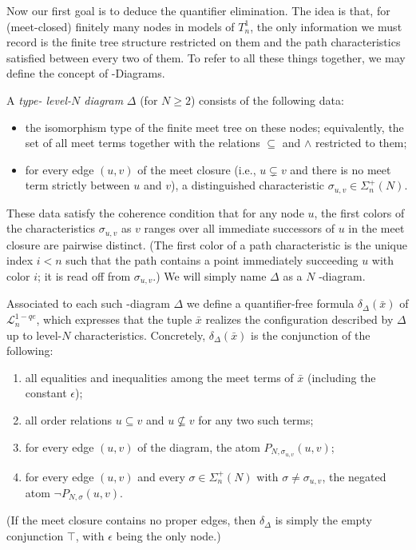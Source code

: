 \documentclass{amsart}
\theoremstyle{definition}
\begin{document}
Now our first goal is to deduce the quantifier elimination. The idea is that, for (meet-closed) finitely many nodes in models of $T_n^1$, the only information we must record is the finite tree structure restricted on them and the path characteristics satisfied between every two of them. To refer to all these things together, we may define the concept of \MakeUppercase{}-Diagrams.

A \emph{type-\MakeUppercase{} level-$N$ diagram} $\Delta$ (for $N\ge 2$) consists of the following data:
\begin{itemize}
    \item the isomorphism type of the finite meet tree on these nodes; equivalently, the set of all meet terms together with the relations $\subseteq$ and $\wedge$ restricted to them;
    \item for every edge $(u,v)$ of the meet closure (i.e., $u\subsetneq v$ and there is no meet term strictly between $u$ and $v$), a distinguished characteristic $\sigma_{u,v}\in\Sigma_n^{+}(N)$.
\end{itemize}
These data satisfy the coherence condition that for any node $u$, the first colors of the characteristics $\sigma_{u,v}$ as $v$ ranges over all immediate successors of $u$ in the meet closure are pairwise distinct. (The first color of a path characteristic is the unique index $i<n$ such that the path contains a point immediately succeeding $u$ with color $i$; it is read off from $\sigma_{u,v}$.) We will simply name $\Delta$ as a $N$ \MakeUppercase{}-diagram.

Associated to each such \MakeUppercase{}-diagram $\Delta$ we define a quantifier-free formula $\delta_{\Delta}(\bar{x})$ of $\mathcal{L}_n^{1-qe}$, which expresses that the tuple $\bar{x}$ realizes the configuration described by $\Delta$ up to level-$N$ characteristics. Concretely, $\delta_{\Delta}(\bar{x})$ is the conjunction of the following:
\begin{enumerate}[label=(\roman*)]
    \item all equalities and inequalities among the meet terms of $\bar{x}$ (including the constant $\epsilon$);
    \item all order relations $u\subseteq v$ and $u\not\subseteq v$ for any two such terms;
    \item for every edge $(u,v)$ of the diagram, the atom $P_{N,\sigma_{u,v}}(u,v)$;
    \item for every edge $(u,v)$ and every $\sigma\in\Sigma_n^{+}(N)$ with $\sigma\neq\sigma_{u,v}$, the negated atom $\neg P_{N,\sigma}(u,v)$.
\end{enumerate}
(If the meet closure contains no proper edges, then $\delta_{\Delta}$ is simply the empty conjunction $\top$, with $\epsilon$ being the only node.)
\end{document}
